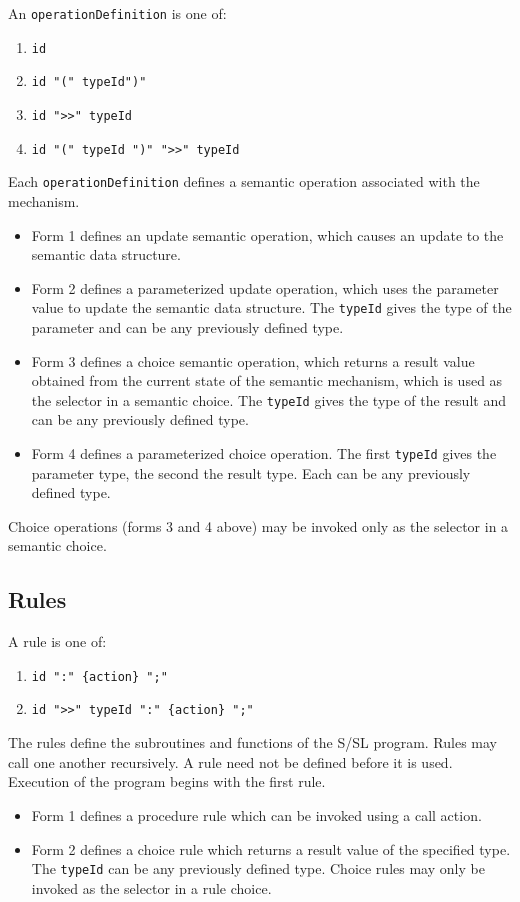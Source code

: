 An {\tt operationDefinition} is one of:
\begin{enumerate}
\item {\tt id}
\item {\tt id "(" typeId")"}
\item {\tt id ">>" typeId}
\item {\tt id "(" typeId ")" ">>" typeId}
\end{enumerate}


Each {\tt operationDefinition} defines  a  semantic operation
associated with the mechanism.
\begin{itemize}
\item Form 1 defines  an         update  semantic  operation,  which
causes an update to the semantic data structure.
\item Form 2 defines a parameterized update operation, which
uses the parameter value to update the semantic data  
structure.  The {\tt typeId} gives the type of the parameter and can be
any previously defined type.
\item Form 3  defines  a         choice  semantic  operation,  which
returns  a  result  value obtained from the current state of
the semantic mechanism, which is used as the selector  in  a
semantic  choice.   The  {\tt typeId} gives the type of the result
and can be any previously defined type.
\item Form 4 defines a parameterized choice  operation. The
first {\tt typeId} gives the parameter type, the second the result
type.  Each can be any previously defined type.
\end{itemize}

Choice operations  (forms 3 and 4 above)  may  be
invoked only as the selector in a semantic choice.




\subsection{Rules}

A rule is one of:
\begin{enumerate}
\item {\tt id     ":"           \{action\} ";"}
\item {\tt id ">>"  typeId  ":" \{action\} ";"}
\end{enumerate}


The     rules  define  the  subroutines and functions of the
S/SL program.  Rules may call one  another  recursively.   A
rule  need  not  be defined before it is used.  Execution of
the program begins with the first rule.
\begin{itemize}
\item Form 1 defines a procedure rule which  can         be  invoked
using a call action.
\item Form 2 defines  a  choice rule which returns a result
value  of  the  specified  type.   The  {\tt typeId}    can  be  any
previously  defined  type.  Choice rules may only be invoked
as the selector in a rule choice.
\end{itemize}



